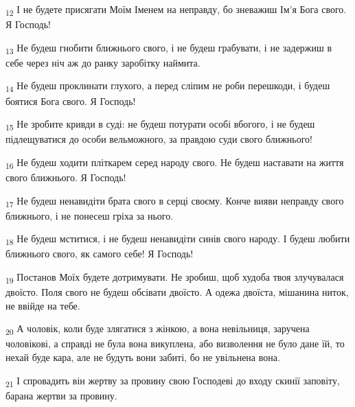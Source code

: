 \begin{tcolorbox}
\textsubscript{12} І не будете присягати Моїм Іменем на неправду, бо зневажиш Ім'я Бога свого. Я Господь!
\end{tcolorbox}
\begin{tcolorbox}
\textsubscript{13} Не будеш гнобити ближнього свого, і не будеш грабувати, і не задержиш в себе через ніч аж до ранку заробітку наймита.
\end{tcolorbox}
\begin{tcolorbox}
\textsubscript{14} Не будеш проклинати глухого, а перед сліпим не роби перешкоди, і будеш боятися Бога свого. Я Господь!
\end{tcolorbox}
\begin{tcolorbox}
\textsubscript{15} Не зробите кривди в суді: не будеш потурати особі вбогого, і не будеш підлещуватися до особи вельможного, за правдою суди свого ближнього!
\end{tcolorbox}
\begin{tcolorbox}
\textsubscript{16} Не будеш ходити пліткарем серед народу свого. Не будеш наставати на життя свого ближнього. Я Господь!
\end{tcolorbox}
\begin{tcolorbox}
\textsubscript{17} Не будеш ненавидіти брата свого в серці своєму. Конче вияви неправду свого ближнього, і не понесеш гріха за нього.
\end{tcolorbox}
\begin{tcolorbox}
\textsubscript{18} Не будеш мститися, і не будеш ненавидіти синів свого народу. І будеш любити ближнього свого, як самого себе! Я Господь!
\end{tcolorbox}
\begin{tcolorbox}
\textsubscript{19} Постанов Моїх будете дотримувати. Не зробиш, щоб худоба твоя злучувалася двоїсто. Поля свого не будеш обсівати двоїсто. А одежа двоїста, мішанина ниток, не ввійде на тебе.
\end{tcolorbox}
\begin{tcolorbox}
\textsubscript{20} А чоловік, коли буде злягатися з жінкою, а вона невільниця, заручена чоловікові, а справді не була вона викуплена, або визволення не було дане їй, то нехай буде кара, але не будуть вони забиті, бо не увільнена вона.
\end{tcolorbox}
\begin{tcolorbox}
\textsubscript{21} І спровадить він жертву за провину свою Господеві до входу скинії заповіту, барана жертви за провину.
\end{tcolorbox}
